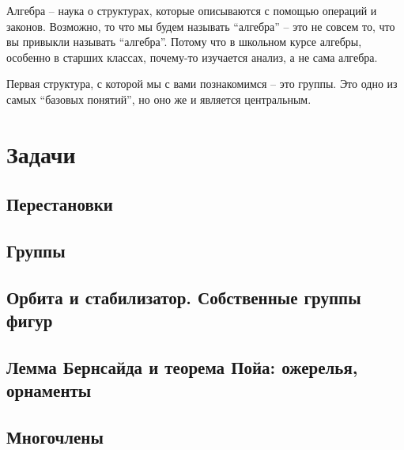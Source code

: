 \documentclass[10pt, twoside]{article}
\begin{document}
\pagestyle{empty}

\newpage

\tableofcontents
\newpage

\setcounter{page}{1}
\pagestyle{fancy}

Алгебра -- наука о структурах, которые описываются с помощью операций и законов. 
Возможно, то что мы будем называть ``алгебра'' -- это не совсем то, что вы привыкли называть ``алгебра''. 
Потому что в школьном курсе алгебры, особенно в старших классах, почему-то изучается анализ, а не сама алгебра.

Первая структура, с которой мы с вами познакомимся -- это группы.
Это одно из самых ``базовых понятий'', но оно же и является центральным. 










\newpage
\renewcommand{\thesubsection}{\roman{subsection}}
\setcounter{subsection}{0}

\section*{Задачи}

\subsection{Перестановки}

\subsection{Группы}

\subsection{Орбита и стабилизатор. Собственные группы фигур}
\subsection{Лемма Бернсайда и теорема Пойа: ожерелья, орнаменты}
% 
\subsection{Многочлены}
% 
\end{document}
